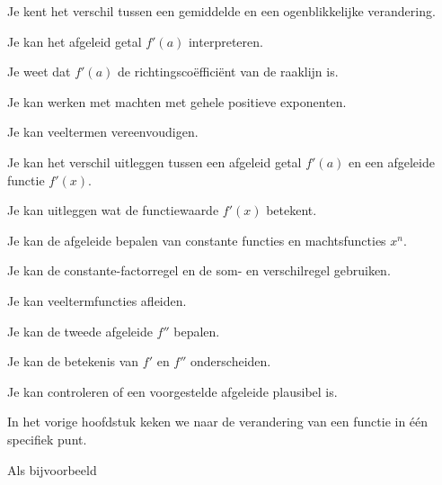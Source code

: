 \documentclass{ximera}
\begin{document}
\maketitle



\begin{voorkennis}
  \item Je kent het verschil tussen een gemiddelde en een
        ogenblikkelijke verandering.
  \item Je kan het afgeleid getal $f'(a)$ interpreteren.
  \item Je weet dat $f'(a)$ de richtingscoëfficiënt van de raaklijn is.
  \item Je kan werken met machten met gehele positieve exponenten.
  \item Je kan veeltermen vereenvoudigen.
\end{voorkennis}

\begin{leerdoelen}
  \item Je kan het verschil uitleggen tussen een afgeleid getal
        $f'(a)$ en een afgeleide functie $f'(x)$.
  \item Je kan uitleggen wat de functiewaarde $f'(x)$ betekent.
  \item Je kan de afgeleide bepalen van constante functies en
        machtsfuncties $x^n$.
  \item Je kan de constante-factorregel en de som- en verschilregel
        gebruiken.
  \item Je kan veeltermfuncties afleiden.
  \item Je kan de tweede afgeleide $f''$ bepalen.
  \item Je kan de betekenis van $f'$ en $f''$ onderscheiden.
  \item Je kan controleren of een voorgestelde afgeleide plausibel is.
\end{leerdoelen}




In het vorige hoofdstuk keken we naar de verandering van een functie
in één specifiek punt.

Als bijvoorbeeld
\end{document}
